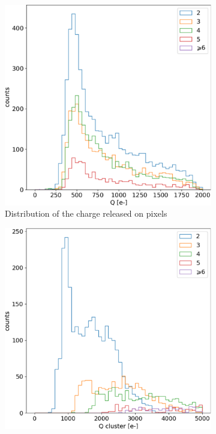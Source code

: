         \begin{figure}
            \centering
            \begin{subfigure}[b]{0.49\textwidth}
                \centering
                \includegraphics[width=\linewidth]{figures/charaterization/cosmic_rays_spectrum_per_pixel.pdf}
                \caption{Distribution of the charge released on pixels}
                \label{fig:CR_pixel}
            \end{subfigure}
            \hfill
            \begin{subfigure}[b]{0.49\textwidth}
                \centering
                \includegraphics[width=\linewidth]{figures/charaterization/cosmic_rays_spectrum_cluster.pdf}

\end{subfigure}
\end{figure}
